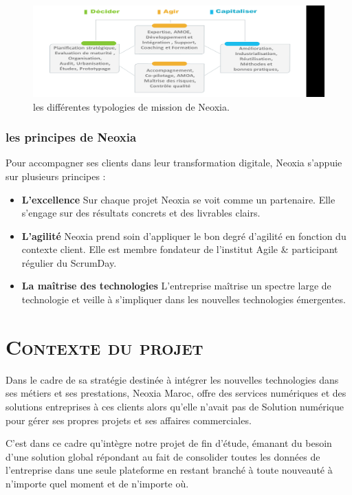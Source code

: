\documentclass[a4paper, 12pt]{report}
\begin{document}
\begin{figure}[H]
\centering
\includegraphics[scale=0.7]{dec.png}
\caption{les différentes typologies de mission de Neoxia.}
\end{figure}

\subsection{les principes de Neoxia}

Pour accompagner ses clients dans leur transformation digitale, 
Neoxia s'appuie sur plusieurs principes : 
\begin{itemize}
	\item \textbf{L'excellence } 
Sur chaque projet Neoxia se voit comme un partenaire. Elle s'engage sur des résultats concrets et des livrables clairs. 
\item \textbf{L'agilité}  
Neoxia prend soin d'appliquer le bon degré d'agilité en fonction du contexte client. Elle est membre fondateur de l'institut Agile & participant régulier du ScrumDay. 

	\item \textbf{La maîtrise des technologies } 
L'entreprise maîtrise un spectre large de technologie et veille à s'impliquer dans les nouvelles technologies émergentes.

\end{itemize}

\chapter{\textsc{Contexte du projet }}	 
Dans le cadre de sa stratégie destinée à intégrer les nouvelles technologies dans ses métiers et ses prestations, Neoxia Maroc, offre des services numériques et des solutions entreprises à ces clients alors qu'elle n'avait pas de Solution numérique pour gérer ses propres projets et ses affaires commerciales.

C'est dans ce cadre qu'intègre notre projet de fin d'étude, émanant du besoin d'une solution global répondant au fait de consolider toutes les données de l'entreprise dans une seule plateforme en restant branché à toute nouveauté à n'importe quel moment et de n'importe où.
\end{document}
